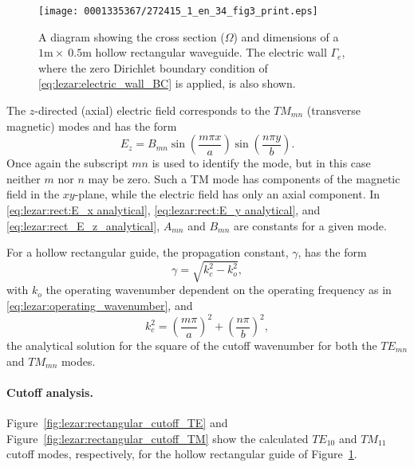 \begin{figure}[!b]
\vspace*{6pt}
\centering
\texttt{[image: 0001335367/272415\_1\_en\_34\_fig3\_print.eps]}
\caption{A diagram showing the cross section ($\Omega$) and dimensions
of a $1\text{m}\times~0.5\text{m}$ hollow rectangular waveguide.
The electric wall $\Gamma_e$, where the zero Dirichlet
boundary condition of \eqref{eq:lezar:electric_wall_BC} is applied, is also shown.}
\label{fig:lezar:hollow_rectangular_guide}
\end{figure}

The $z$-directed (axial) electric field corresponds to the $TM_{mn}$
(transverse magnetic) modes and has the form~\citep{Pozar2005}\vspace*{3pt}
\begin{equation}
 \label{eq:lezar:rect_E_z_analytical}
 E_z = B_{mn}\sin\left(\frac{m\pi x}{a}\right)\sin\left(\frac{n\pi y}{b}\right).
\end{equation}
Once again the subscript $mn$ is used to identify the mode, but in
this case neither $m$ nor $n$ may be zero. Such a TM mode has
components of the magnetic field in the $xy$-plane, while the electric
field has only an axial component. In \eqref{eq:lezar:rect:E_x
analytical}, \eqref{eq:lezar:rect:E_y analytical},
and \eqref{eq:lezar:rect_E_z_analytical}, $A_{mn}$ and $B_{mn}$ are
constants for a given mode.

For a hollow rectangular guide, the propagation constant, $\gamma$,
has the form
\begin{equation}
 \label{eq:lezar:rectangular_propagation}
 \gamma = \sqrt{k_c^2 - k_o^2},
\end{equation}
with $k_o$ the operating wavenumber dependent on the operating frequency
as in \eqref{eq:lezar:operating_wavenumber}, and
\begin{equation}
 \label{eq:lezar:rectangular_cutoff}
 k_c^2 = \left(\frac{m\pi}{a}\right)^2 + \left(\frac{n\pi}{b}\right)^2,
\end{equation}
the analytical solution for the square of the cutoff
wavenumber for both the $TE_{mn}$ and
$TM_{mn}$ modes.

\paragraph{Cutoff analysis.}

Figure~\ref{fig:lezar:rectangular_cutoff_TE} and
Figure~\ref{fig:lezar:rectangular_cutoff_TM} show the calculated $TE_{10}$
and $TM_{11}$ cutoff modes, respectively, for the hollow rectangular
guide of Figure~\ref{fig:lezar:hollow_rectangular_guide}.

